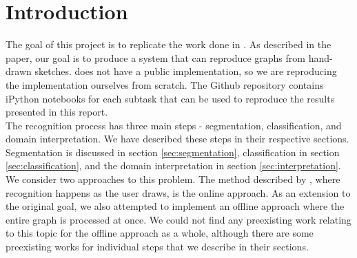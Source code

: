\section{Introduction}

The goal of this project is to replicate the work done in \citeauthor{daly2015hand} \cite{daly2015hand}. As described in the paper, our goal is to produce a system that can reproduce graphs from hand-drawn sketches. \citeauthor{daly2015hand} does not have a public implementation, so we are reproducing the implementation ourselves from scratch. The Github repository contains iPython notebooks for each subtask that can be used to reproduce the results presented in this report.\\

The recognition process has three main steps - segmentation, classification, and domain interpretation. We have described these steps in their respective sections. Segmentation is discussed in section \ref{sec:segmentation}, classification in section \ref{sec:classification}, and the domain interpretation in section \ref{sec:interpretation}. \\

We consider two approaches to this problem. The method described by \citeauthor{daly2015hand}, where recognition happens as the user draws, is the online approach. As an extension to the original goal, we also attempted to implement an offline approach where the entire graph is processed at once. We could not find any preexisting work relating to this topic for the offline approach as a whole, although there are some preexisting works for individual steps that we describe in their sections.
